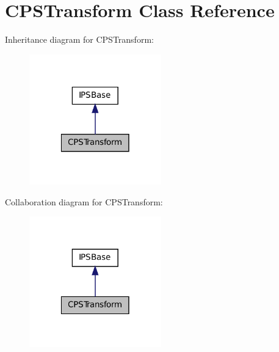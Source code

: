 \hypertarget{classCPSTransform}{
\section{CPSTransform Class Reference}
\label{classCPSTransform}
}


Inheritance diagram for CPSTransform:\nopagebreak
\begin{figure}[H]
\begin{center}
\leavevmode
\includegraphics[width=162pt]{classCPSTransform__inherit__graph}
\end{center}
\end{figure}


Collaboration diagram for CPSTransform:\nopagebreak
\begin{figure}[H]
\begin{center}
\leavevmode
\includegraphics[width=162pt]{classCPSTransform__coll__graph}
\end{center}
\end{figure}
